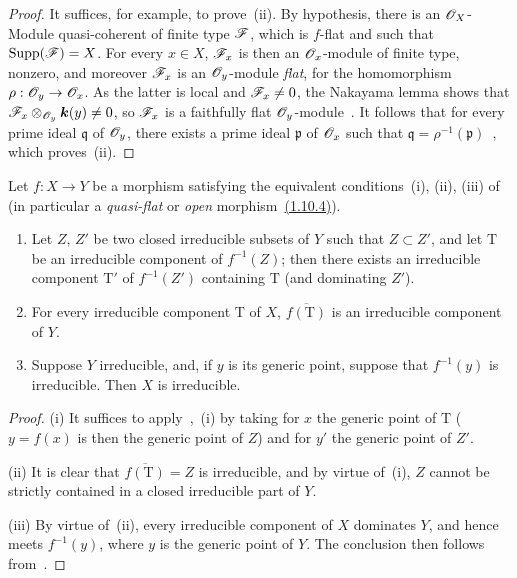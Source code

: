\begin{proof}
It suffices, for example, to prove~(ii).
By hypothesis, there is an $\mathscr{O}_X$-Module quasi-coherent of finite type $\mathscr{F}$, which is $f$-flat and such that $\operatorname{Supp}(\mathscr{F})=X$.
For every $x\in X$, $\mathscr{F}_x$ is then an $\mathscr{O}_x$-module of finite type, nonzero, and moreover $\mathscr{F}_x$ is an $\mathscr{O}_y$-module \emph{flat}, for the homomorphism $\rho:\mathscr{O}_y\to\mathscr{O}_x$.
As the latter is local and $\mathscr{F}_x\neq 0$, the Nakayama lemma shows that $\mathscr{F}_x\otimes_{\mathscr{O}_y}\boldsymbol{k}(y)\neq 0$, so $\mathscr{F}_x$ is a faithfully flat $\mathscr{O}_y$-module~.
It follows that for every prime ideal $\mathfrak{q}$ of $\mathscr{O}_y$, there exists a prime ideal $\mathfrak{p}$ of $\mathscr{O}_x$ such that $\mathfrak{q}=\rho^{-1}(\mathfrak{p})$~, which proves~(ii).
\end{proof}

\begin{corollary}[2.3.5]
\label{IV.2.3.5}
Let $f:X\to Y$ be a morphism satisfying the equivalent conditions~\textup{(i), (ii), (iii)} of~ \textup{(in particular a \emph{quasi-flat} or \emph{open} morphism~{\hyperref[IV.1.10.4]{(1.10.4)}})}.
\begin{enumerate}
  \item[\textup{(i)}] Let $Z$, $Z'$ be two closed irreducible subsets of $Y$ such that $Z\subset Z'$, and let $\mathrm{T}$ be an irreducible component of $f^{-1}(Z)$; then there exists an irreducible component $\mathrm{T}'$ of $f^{-1}(Z')$ containing $\mathrm{T}$ \textnormal{(}and dominating $Z'$\textnormal{)}.
  \item[\textup{(ii)}] For every irreducible component $\mathrm{T}$ of $X$, $\overline{f(\mathrm{T})}$ is an irreducible component of $Y$.
  \item[\textup{(iii)}] Suppose $Y$ irreducible, and, if $y$ is its generic point, suppose that $f^{-1}(y)$ is irreducible. Then $X$ is irreducible.
\end{enumerate}
\end{corollary}

\begin{proof}
(i) It suffices to apply~,~(i) by taking for $x$ the generic point of $\mathrm{T}$ ($y=f(x)$ is then the generic point of $Z$) and for $y'$ the generic point of $Z'$.

(ii) It is clear that $\overline{f(\mathrm{T})}=Z$ is irreducible, and by virtue of~(i), $Z$ cannot be strictly contained in a closed irreducible part of $Y$.

(iii) By virtue of~(ii), every irreducible component of $X$ dominates $Y$, and hence meets $f^{-1}(y)$, where $y$ is the generic point of $Y$.
The conclusion then follows from~.
\end{proof}

